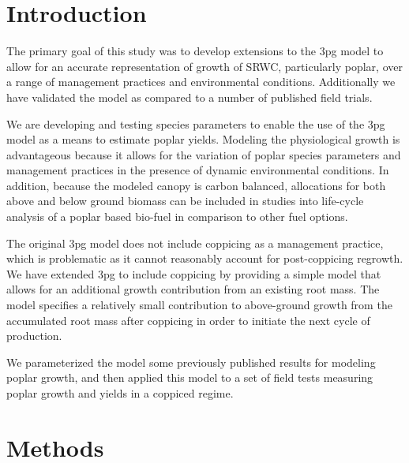 \documentclass[10pt]{article}
\begin{document}

\section*{Introduction}

The primary goal of this study was to develop extensions to the
\ac{3pg} model to allow for an accurate representation of growth of
\ac{SRWC}, particularly poplar, over a range of management practices
and environmental conditions.  Additionally we have validated the
model as compared to a number of published field trials.

We are developing and testing species parameters to enable the use of
the \acf{3pg} model as a means to estimate poplar yields.  Modeling
the physiological growth is advantageous because it allows for the
variation of poplar species parameters and management practices in the
presence of dynamic environmental conditions.  In addition, because
the modeled canopy is carbon balanced, allocations for both above and
below ground biomass can be included in studies into life-cycle
analysis of a poplar based bio-fuel in comparison to other fuel
options.

The original \ac{3pg} model does not include coppicing as a management
practice, which is problematic as it cannot reasonably account for
post-coppicing regrowth.  We have extended \ac{3pg} to include
coppicing by providing a simple model that allows for an additional
growth contribution from an existing root mass.  The model specifies a
relatively small contribution to above-ground growth from the
accumulated root mass after coppicing in order to initiate the next
cycle of production.

We parameterized the model some previously published results for
modeling poplar growth, and then applied this model to a set of field
tests measuring poplar growth and yields in a coppiced regime.

\section*{Methods}
\end{document}
